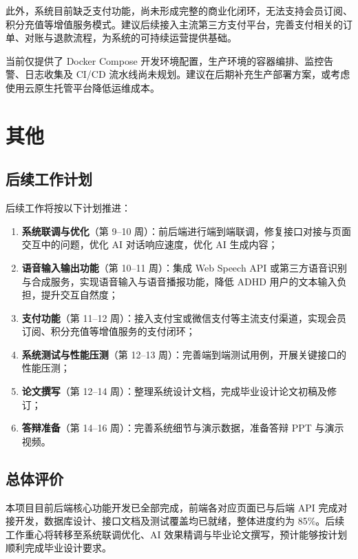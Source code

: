 \par 此外，系统目前缺乏支付功能，尚未形成完整的商业化闭环，无法支持会员订阅、积分充值等增值服务模式。建议后续接入主流第三方支付平台，完善支付相关的订单、对账与退款流程，为系统的可持续运营提供基础。

\par 当前仅提供了 Docker Compose 开发环境配置，生产环境的容器编排、监控告警、日志收集及 CI/CD 流水线尚未规划。建议在后期补充生产部署方案，或考虑使用云原生托管平台降低运维成本。

\clearpage

\section{其他}

\subsection{后续工作计划}

\par 后续工作将按以下计划推进：
\begin{enumerate}
    \item \textbf{系统联调与优化}（第 9--10 周）：前后端进行端到端联调，修复接口对接与页面交互中的问题，优化 AI 对话响应速度，优化 AI 生成内容；
    \item \textbf{语音输入输出功能}（第 10--11 周）：集成 Web Speech API 或第三方语音识别与合成服务，实现语音输入与语音播报功能，降低 ADHD 用户的文本输入负担，提升交互自然度；
    \item \textbf{支付功能}（第 11--12 周）：接入支付宝或微信支付等主流支付渠道，实现会员订阅、积分充值等增值服务的支付闭环；
    \item \textbf{系统测试与性能压测}（第 12--13 周）：完善端到端测试用例，开展关键接口的性能压测；
    \item \textbf{论文撰写}（第 12--14 周）：整理系统设计文档，完成毕业设计论文初稿及修订；
    \item \textbf{答辩准备}（第 14--16 周）：完善系统细节与演示数据，准备答辩 PPT 与演示视频。
\end{enumerate}

\subsection{总体评价}

\par 本项目目前后端核心功能开发已全部完成，前端各对应页面已与后端 API 完成对接开发，数据库设计、接口文档及测试覆盖均已就绪，整体进度约为 85\%。后续工作重心将转移至系统联调优化、AI 效果精调与毕业论文撰写，预计能够按计划顺利完成毕业设计要求。

